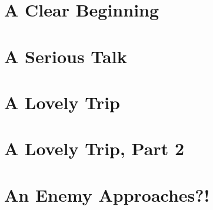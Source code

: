 \documentclass[oneside,11pt]{memoir} %
\begin{document}
\chapter{A Clear Beginning}




\chapter{A Serious Talk}



\chapter{A Lovely Trip}



\chapter{A Lovely Trip, Part 2}



\chapter{An Enemy Approaches?!}

\end{document}

